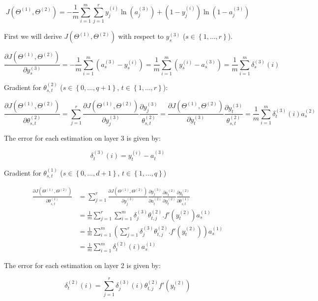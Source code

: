 \documentclass[a4, article]{article}
\begin{document}
\[
J(\Theta^{(1)}, \Theta^{(2)}) = - \frac{1}{m} \sum_{i=1}^m \sum_{j=1}^r y_j^{(i)} \ln(a_j^{(3)}) + (1 - y_j^{(i)}) \ln(1 - a_j^{(3)})
\]

First we will derive $J(\Theta^{(1)}, \Theta^{(2)})$ with respect to $y_s^{(3)}$ ($ s \in \left\{1, \dots, r \right\}$).

\[
\frac{\partial J(\Theta^{(1)}, \Theta^{(2)})}{\partial y_s^{(3)}} = - \frac{1}{m} \sum_{i=1}^m \left( a_s^{(3)} - y_s^{(i)} \right) = \frac{1}{m} \sum_{i=1}^m \left( y_s^{(i)} - a_s^{(3)} \right) =
\frac{1}{m} \sum_{i=1}^m \delta_s^{(3)}\left( i \right)
\]

Gradient for $\theta_{s,t}^{(2)}$ ($s \in \left\{0, \dots, q+1\right\}$, $t \in \left\{1, \dots, r\right\}$):

\[
\frac{\partial J(\Theta^{(1)}, \Theta^{(2)})}{\partial \theta_{s, t}^{(2)}} =
\sum_{j=1}^r \frac{\partial J(\Theta^{(1)}, \Theta^{(2)})}{\partial y_j^{(3)}}
\frac{\partial y_j^{(3)}}{\theta_{s, t}^{(2)}} = 
\frac{\partial J(\Theta^{(1)}, \Theta^{(2)})}{\partial y_t^{(3)}}
\frac{\partial y_t^{(3)}}{\theta_{s, t}^{(2)}} =
\frac{1}{m} \sum_{i=1}^m \delta_t^{(3)} \left( i \right) a_s^{(2)}
\]

The error for each estimation on layer 3 is given by:

\[
\delta_t^{(3)}\left( i \right) = y_t^{(i)} - a_t^{(3)}
\]

Gradient for $\theta_{s,t}^{(1)}$ ($s \in \left\{0, \dots, d+1\right\}$, $t \in \left\{1, \dots, q\right\}$)

\begin{eqnarray*}
\frac{\partial J(\Theta^{(1)}, \Theta^{(2)})}{\partial \theta_{s, t}^{(1)}} &= 
\sum_{j=1}^r \frac{\partial J(\Theta^{(1)}, \Theta^{(2)})}{\partial y_j^{(3)}}
\frac{\partial y_j^{(3)}}{\partial a_t^{(2)}} \frac{\partial a_t^{(2)}}{ \partial y_t^{(2)} }
\frac{\partial y_t^{(2)}}{\partial \theta_{s, t}^{(1)}} \\
&= \frac{1}{m} \sum_{j=1}^r \sum_{i=1}^m \delta_j^{(3)} \theta_{t, j}^{(2)}.f'(y_t^{(2)})a_s^{(1)} \\
&= \frac{1}{m} \sum_{i=1}^m \left( \sum_{j=1}^r  \delta_j^{(3)} \theta_{t, j}^{(2)}.f'(y_t^{(2)}) \right) a_s^{(1)} \\
&= \frac{1}{m} \sum_{i=1}^m \delta_t^{(2)} \left( i \right) a_s^{(1)}
\end{eqnarray*}

The error for each estimation on layer 2 is given by:

\[
\delta_t^{(2)} \left( i \right) = \sum_{j=1}^r  \delta_j^{(3)} \left( i \right) \theta_{t, j}^{(2)} f'(y_t^{(2)})
\]
\end{document}
